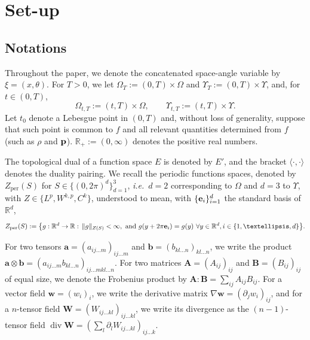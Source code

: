 \documentclass[11pt,a4paper,reqno]{amsart}
\theoremstyle{remark}
\theoremstyle{definition}
\numberwithin{equation}{section}
\newcommand{\per}{\mathrm{per}}
\DeclareMathOperator{\dv}{div}
\newcommand{\p}{{\bf p}}
\newcommand{\e}{{\bf e}}
\newcommand{\bxi}{\xi}
\begin{document}
\vspace{-0.1cm}
\section{Set-up}\label{sec:setup}

\subsection{Notations} Throughout the paper, we denote the concatenated space-angle variable by $\bxi = (x,\theta)$. For $T>0$, we let $\Omega_T := (0,T)\times\Omega$ and $\Upsilon_T := (0,T)\times\Upsilon$, and, for $t \in (0,T)$, $$\Omega_{t,T} := (t,T) \times \Omega, \qquad \Upsilon_{t,T} := (t,T) \times \Upsilon.$$ 
Let 
$t_0$ denote a Lebesgue point in $(0,T)$ and, without loss of generality, suppose that such point is common to $f$ and all relevant quantities determined from $f$ (such as $\rho$ and $\p$).  $\mathbb{R}_+ := (0,\infty)$ denotes the positive real numbers. 

The topological dual of a function space $E$ is denoted by $E'$, and the bracket $\langle \cdot, \cdot \rangle$  denotes the duality pairing. We recall the periodic functions spaces, denoted by $Z_\per(S)$ for $S \in \{(0,2\pi)^d\}_{d=1}^3$, \textit{i.e.}~$d=2$ corresponding to $\Omega$ and $d=3$ to $\Upsilon$, with $Z \in \{L^p,W^{k,p},C^k\}$, understood to mean, with $\{\e_i\}_{i=1}^d$ the standard basis of $\mathbb{R}^d$, 
\begin{equation*}
    Z_\per(S) := \big\{ g:\mathbb{R}^d \to \mathbb{R}: \, \Vert g \Vert_{Z(S)} < \infty, \text{ and } g(y+2\pi \e_i) = g(y) ~ \forall y \in \mathbb{R}^d, i \in \{1,\dots,d\}  \big\}. 
\end{equation*}
 
For two tensors $\mathbf{a} = (a_{ij\dots m})_{ij\dots m}$ and $\mathbf{b} = (b_{kl\dots n})_{kl\dots n}$, we write the product $\mathbf{a} \otimes \mathbf{b} = (a_{ij\dots m} b_{kl\dots n})_{ij \dots m kl \dots n}$. For two matrices $\mathbf{A} = (A_{ij})_{ij}$ and $\mathbf{B} = (B_{ij})_{ij}$ of equal size, we denote the Frobenius product by $\mathbf{A} : \mathbf{B} = \sum_{ij} A_{ij}B_{ij}$. For a vector field $\mathbf{w}=(w_i)_i$, we write the derivative matrix $\nabla\mathbf{w} = (\partial_j w_i)_{ij}$, and for a $n$-tensor field $\mathbf{W} = (W_{ij\dots kl})_{ij\dots kl}$, we write its divergence as the $(n-1)$-tensor field $\dv \mathbf{W} = (\sum_l \partial_l W_{ij\dots kl})_{ij\dots k}$. 
\end{document}

